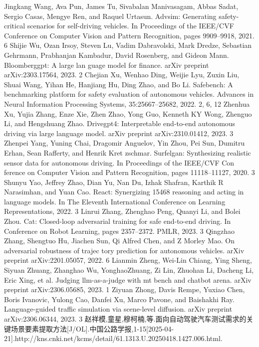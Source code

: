 \documentclass{article}
\begin{document}
\begin{thebibliography}{99}
	Jingkang Wang, Ava Pun, James Tu, Sivabalan Manivasagam, Abbas Sadat, Sergio Casas, Mengye Ren, and Raquel Urtasun. Advsim: Generating safety-critical scenarios for self-driving vehicles. In Proceedings of the IEEE/CVF Conference on Computer Vision and Pattern Recognition, pages 9909–9918, 2021. 6
	Shijie Wu, Ozan Irsoy, Steven Lu, Vadim Dabravolski, Mark Dredze, Sebastian Gehrmann, Prabhanjan Kambadur, David Rosenberg, and Gideon Mann. Bloomberggpt: A large lan guage model for finance. arXiv preprint arXiv:2303.17564, 2023. 2
	Chejian Xu, Wenhao Ding, Weijie Lyu, Zuxin Liu, Shuai Wang, Yihan He, Hanjiang Hu, Ding Zhao, and Bo Li. Safebench: A benchmarking platform for safety evaluation of autonomous vehicles. Advances in Neural Information Processing Systems, 35:25667–25682, 2022. 2, 6, 12 
	Zhenhua Xu, Yujia Zhang, Enze Xie, Zhen Zhao, Yong Guo, Kenneth KY Wong, Zhenguo Li, and Hengshuang Zhao. Drivegpt4: Interpretable end-to-end autonomous driving via large language model. arXiv preprint arXiv:2310.01412, 2023. 3 
	Zhenpei Yang, Yuning Chai, Dragomir Anguelov, Yin Zhou, Pei Sun, Dumitru Erhan, Sean Rafferty, and Henrik Kret zschmar. Surfelgan: Synthesizing realistic sensor data for autonomous driving. In Proceedings of the IEEE/CVF Con ference on Computer Vision and Pattern Recognition, pages 11118–11127, 2020. 3
	Shunyu Yao, Jeffrey Zhao, Dian Yu, Nan Du, Izhak Shafran, Karthik R Narasimhan, and Yuan Cao. React: Synergizing 15468 reasoning and acting in language models. In The Eleventh International Conference on Learning Representations, 2022. 3 
	Linrui Zhang, Zhenghao Peng, Quanyi Li, and Bolei Zhou. Cat: Closed-loop adversarial training for safe end-to-end driving. In Conference on Robot Learning, pages 2357–2372. PMLR, 2023. 3
	Qingzhao Zhang, Shengtuo Hu, Jiachen Sun, Qi Alfred Chen, and Z Morley Mao. On adversarial robustness of trajec tory prediction for autonomous vehicles. arXiv preprint arXiv:2201.05057, 2022. 6 
	Lianmin Zheng, Wei-Lin Chiang, Ying Sheng, Siyuan Zhuang, Zhanghao Wu, YonghaoZhuang, Zi Lin, Zhuohan Li, Dacheng Li, Eric Xing, et al. Judging llm-as-a-judge with mt bench and chatbot arena. arXiv preprint arXiv:2306.05685, 2023. 1 
	Ziyuan Zhong, Davis Rempe, Yuxiao Chen, Boris Ivanovic, Yulong Cao, Danfei Xu, Marco Pavone, and Baishakhi Ray. Language-guided traffic simulation via scene-level diffusion. arXiv preprint arXiv:2306.06344, 2023. 3
	赵祥模,童星,穆柯楠,等.面向自动驾驶汽车测试需求的关键场景要素提取方法[J/OL].中国公路学报,1-15[2025-04-21].http://kns.cnki.net/kcms/detail/61.1313.U.20250418.1427.006.html.

\end{thebibliography}
\end{document}
